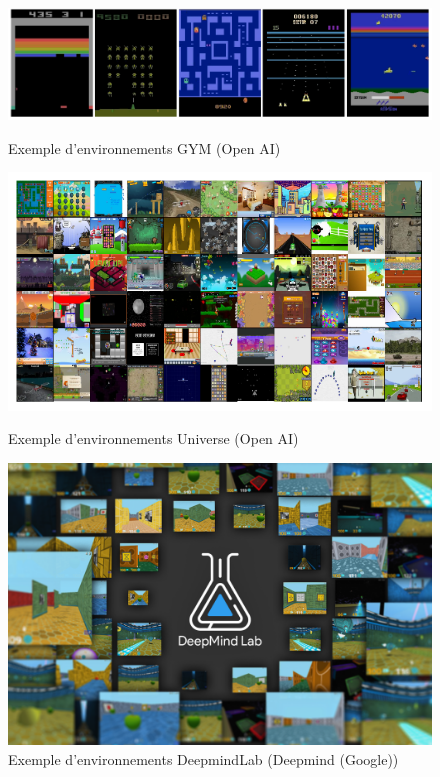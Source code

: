 \bigskip
\begin{figure}
\centering
\includegraphics[width=.9\linewidth]{./assets/GYM/gym2}
\caption{Exemple d'environnements GYM (Open AI)}

\bigskip

\includegraphics[width=.9\linewidth]{./assets/GYM/gym}
\caption{Exemple d'environnements Universe (Open AI)}

\bigskip

\includegraphics[width=.6\linewidth]{./assets/GYM/deepmindlab}
\caption{Exemple d'environnements DeepmindLab (Deepmind (Google)) }
\medskip
\small
\end{figure}



